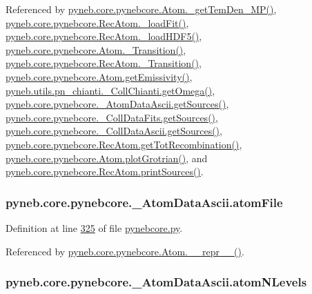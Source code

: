 Referenced by \hyperlink{pynebcore_8py_source_l02046}{pyneb.\-core.\-pynebcore.\-Atom.\-\_\-get\-Tem\-Den\-\_\-\-M\-P()}, \hyperlink{pynebcore_8py_source_l02754}{pyneb.\-core.\-pynebcore.\-Rec\-Atom.\-\_\-load\-Fit()}, \hyperlink{pynebcore_8py_source_l02714}{pyneb.\-core.\-pynebcore.\-Rec\-Atom.\-\_\-load\-H\-D\-F5()}, \hyperlink{pynebcore_8py_source_l01433}{pyneb.\-core.\-pynebcore.\-Atom.\-\_\-\-Transition()}, \hyperlink{pynebcore_8py_source_l02812}{pyneb.\-core.\-pynebcore.\-Rec\-Atom.\-\_\-\-Transition()}, \hyperlink{pynebcore_8py_source_l01782}{pyneb.\-core.\-pynebcore.\-Atom.\-get\-Emissivity()}, \hyperlink{pn__chianti_8py_source_l00507}{pyneb.\-utils.\-pn\-\_\-chianti.\-\_\-\-Coll\-Chianti.\-get\-Omega()}, \hyperlink{pynebcore_8py_source_l00460}{pyneb.\-core.\-pynebcore.\-\_\-\-Atom\-Data\-Ascii.\-get\-Sources()}, \hyperlink{pynebcore_8py_source_l00690}{pyneb.\-core.\-pynebcore.\-\_\-\-Coll\-Data\-Fits.\-get\-Sources()}, \hyperlink{pynebcore_8py_source_l01022}{pyneb.\-core.\-pynebcore.\-\_\-\-Coll\-Data\-Ascii.\-get\-Sources()}, \hyperlink{pynebcore_8py_source_l02851}{pyneb.\-core.\-pynebcore.\-Rec\-Atom.\-get\-Tot\-Recombination()}, \hyperlink{pynebcore_8py_source_l02443}{pyneb.\-core.\-pynebcore.\-Atom.\-plot\-Grotrian()}, and \hyperlink{pynebcore_8py_source_l02912}{pyneb.\-core.\-pynebcore.\-Rec\-Atom.\-print\-Sources()}.

\hypertarget{classpyneb_1_1core_1_1pynebcore_1_1___atom_data_ascii_a1163ceae1cb5263c39055a9c02f5c051}{
\subsubsection[{atom\-File}]{\setlength{\rightskip}{0pt plus 5cm}pyneb.\-core.\-pynebcore.\-\_\-\-Atom\-Data\-Ascii.\-atom\-File}}\label{classpyneb_1_1core_1_1pynebcore_1_1___atom_data_ascii_a1163ceae1cb5263c39055a9c02f5c051}


Definition at line \hyperlink{pynebcore_8py_source_l00325}{325} of file \hyperlink{pynebcore_8py_source}{pynebcore.\-py}.



Referenced by \hyperlink{pynebcore_8py_source_l02615}{pyneb.\-core.\-pynebcore.\-Atom.\-\_\-\-\_\-repr\-\_\-\-\_\-()}.

\hypertarget{classpyneb_1_1core_1_1pynebcore_1_1___atom_data_ascii_a58e3b3de028fdda9d52cade8e378fe2d}{
\subsubsection[{atom\-N\-Levels}]{\setlength{\rightskip}{0pt plus 5cm}pyneb.\-core.\-pynebcore.\-\_\-\-Atom\-Data\-Ascii.\-atom\-N\-Levels}}\label{classpyneb_1_1core_1_1pynebcore_1_1___atom_data_ascii_a58e3b3de028fdda9d52cade8e378fe2d}


